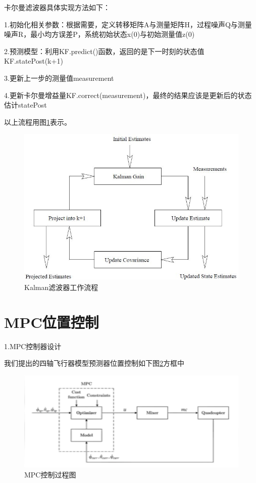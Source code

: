 卡尔曼滤波器具体实现方法如下：

1.初始化相关参数：根据需要，定义转移矩阵A与测量矩阵H，过程噪声Q与测量噪声R，最小均方误差P，系统初始状态x(0)与初始测量值z(0)

2.预测模型：利用KF.predict()函数，返回的是下一时刻的状态值KF.statePost(k+1)

3.更新上一步的测量值measurement

4.更新卡尔曼增益量KF.correct(measurement)，最终的结果应该是更新后的状态估计statePost

以上流程用图\ref{Fig:img9}表示。

\begin{figure}[ht]
  \centering
  \includegraphics[width=0.8\linewidth]{./Figure/Kalman_Filter_Code_Process.jpeg}
  \caption{Kalman滤波器工作流程}\label{Fig:img9}
\end{figure}

\section{MPC位置控制}

1.MPC控制器设计

我们提出的四轴飞行器模型预测器位置控制如下图\ref{Fig:img10}方框中

\begin{figure}[ht]
  \centering
  \includegraphics[width=0.8\linewidth]{./Figure/MPC-Diagram.png}
  \caption{MPC控制过程图}\label{Fig:img10}
\end{figure}

